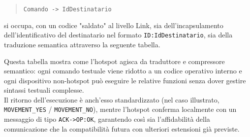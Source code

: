 \begin{quote}
\texttt{Comando -> IdDestinatario}
\end{quote}

si occupa, con un codice "saldato" al livello Link, sia 
dell'incapsulamento dell'identificativo del destinatario nel formato 
\texttt{ID:IdDestinatario}, sia della traduzione semantica attraverso la seguente tabella. \\
\begin{table}[H]
    \centering
    \label{tab:comandi_hotspot}
    \caption{Mappatura comandi Blynk, operazioni interne e azioni eseguite dai nodi}
\end{table}
Questa tabella mostra come l’hotspot agisca da traduttore e compressore semantico: 
ogni comando testuale viene ridotto a un codice operativo interno e 
ogni dispositivo non-hotspot può eseguire le relative funzioni senza dover 
gestire sintassi testuali complesse. \\ 
Il ritorno dell’esecuzione è anch’esso 
standardizzato (nel caso illustrato, \texttt{MOVEMENT\_YES} / \texttt{MOVEMENT\_NO}), 
mentre l’hotspot conferma localmente con un messaggio di tipo 
\texttt{ACK->OP:OK}, garantendo così sia l’affidabilità della comunicazione 
che la compatibilità futura con ulteriori estensioni già previste.



